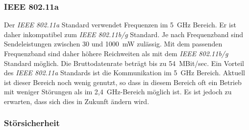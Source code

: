         \subsubsection{IEEE 802.11a}
            Der \emph{IEEE 802.11a} Standard verwendet Frequenzen im 5~GHz Bereich. Er ist daher
            inkompatibel zum \emph{IEEE 802.11b/g} Standard. Je nach Frequenzband sind 
            Sendeleistungen zwischen 30 und 1000~mW zulässig. Mit dem passenden Frequenzband
            sind daher höhere Reichweiten als mit dem \emph{IEEE 802.11b/g} Standard möglich.
            Die Bruttodatenrate beträgt bis zu 54~MBit/sec. 
            Ein Vorteil des \emph{IEEE 802.11a} Standards ist die Kommunikation im 5~GHz Bereich.
            Aktuell ist dieser Bereich noch wenig genutzt, so dass in diesem
            Bereich oft ein Betrieb mit weniger Störungen als im 2,4~GHz-Bereich möglich ist.
            Es ist jedoch zu erwarten, dass sich dies in Zukunft ändern wird.

        \subsubsection{Störsicherheit}\label{WlanStoersicherheit}

